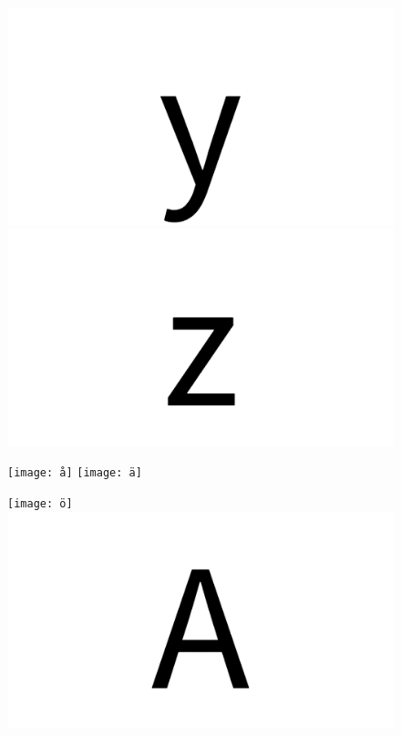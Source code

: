\documentclass{article}
\begin{document}
\begin{figure}[H]
  \includegraphics[width=\linewidth]{y}
\endminipage\hfill
{}
  \includegraphics[width=\linewidth]{z}
\endminipage\hfill
\end{figure}

\begin{figure}[H]
  \texttt{[image: å]}
\endminipage\hfill
{}
  \texttt{[image: ä]}
\endminipage\hfill
\end{figure}

\begin{figure}[H]
  \texttt{[image: ö]}
\endminipage\hfill
{}
  \includegraphics[width=\linewidth]{u_A}
\endminipage\hfill
\end{figure}
\end{document}
